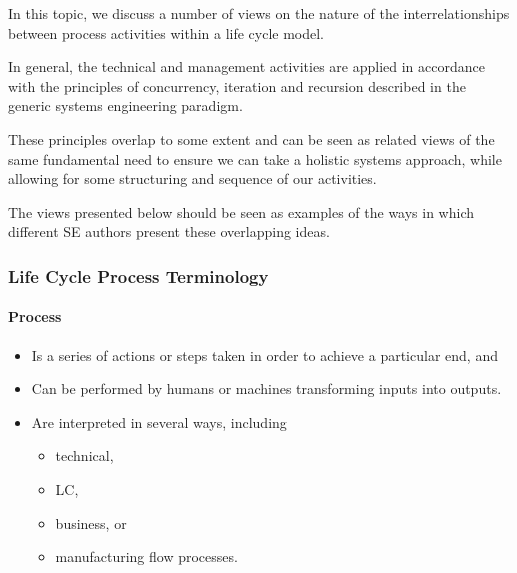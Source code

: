 \documentclass[letterpaper,10pt,english]{jupyterBook}
\begin{document}
\sphinxAtStartPar
In this topic, we discuss a number of views on the nature of the inter\sphinxhyphen{}relationships between process activities within a life cycle model.

\sphinxAtStartPar
In general, the technical and management activities are applied in accordance with the principles of concurrency, iteration and recursion described in the generic systems engineering paradigm.

\sphinxAtStartPar
These principles overlap to some extent and can be seen as related views of the same fundamental need to ensure we can take a holistic systems approach, while allowing for some structuring and sequence of our activities.

\sphinxAtStartPar
The views presented below should be seen as examples of the ways in which different SE authors present these overlapping ideas.


\subsubsection{Life Cycle Process Terminology}
\label{\detokenize{SE/sebok:life-cycle-process-terminology}}

\paragraph{Process}
\label{\detokenize{SE/sebok:process}}\begin{itemize}
\item {} 
\sphinxAtStartPar
Is a series of actions or steps taken in order to achieve a particular end, and

\item {} 
\sphinxAtStartPar
Can be performed by humans or machines transforming inputs into outputs.

\item {} 
\sphinxAtStartPar
Are interpreted in several ways, including
\begin{itemize}
\item {} 
\sphinxAtStartPar
technical,

\item {} 
\sphinxAtStartPar
LC,

\item {} 
\sphinxAtStartPar
business, or

\item {} 
\sphinxAtStartPar
manufacturing flow processes.

\end{itemize}

\end{itemize}
\end{document}
